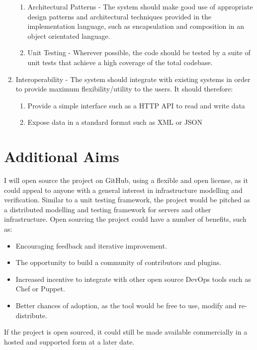 \documentclass{cshonours}
\begin{document}
\begin{enumerate}
\begin{enumerate}
      \item Architectural Patterns - The system should make good use of appropriate design patterns and architectural techniques provided in the implementation language, such as encapsulation and composition in an object orientated language.
      \item Unit Testing - Wherever possible, the code should be tested by a suite of unit tests that achieve a high coverage of the total codebase.
    \end{enumerate}
  \item Interoperability - The system should integrate with existing systems in order to provide maximum flexibility/utility to the users. It should therefore:
    \begin{enumerate}
      \item Provide a simple interface such as a HTTP API to read and write data
      \item Expose data in a standard format such as XML or JSON
    \end{enumerate}
\end{enumerate}

\section{Additional Aims}

I will open source the project on GitHub, using a flexible and open license, as it could appeal to anyone with a general interest in infrastructure modelling and verification. Similar to a unit testing framework, the project would be pitched as a distributed modelling and testing framework for servers and other infrastructure. Open sourcing the project could have a number of benefits, such as:

\begin{itemize}
  \item Encouraging feedback and iterative improvement.
  \item The opportunity to build a community of contributors and plugins.
  \item Increased incentive to integrate with other open source DevOps tools such as Chef or Puppet.
  \item Better chances of adoption, as the tool would be free to use, modify and re-distribute.
\end{itemize}

If the project is open sourced, it could still be made available commercially in a hosted and supported form at a later date.
\end{document}
